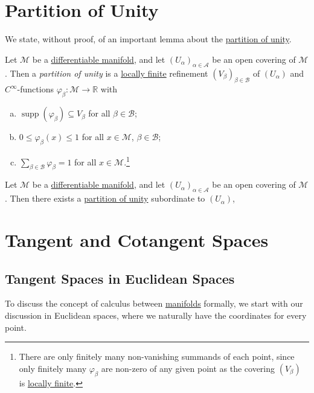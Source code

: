 \section{Partition of Unity}
We state, without proof, of an important lemma about the \hyperref[def:partition-of-unity]{partition of unity}.

\begin{definition}\label{def:partition-of-unity}
	Let \(\mathcal{M} \) be a \hyperref[def:smooth-manifold]{differentiable manifold}, and let \((U_\alpha )_{\alpha \in \mathcal{A} }\) be an open covering of \(\mathcal{M} \). Then a \emph{partition of unity} is a \hyperref[def:locally-finite]{locally finite} refinement \((V_\beta )_{\beta \in \mathcal{B} }\) of \((U_\alpha )\) and \(C^{\infty} \)-functions \(\varphi _\beta \colon \mathcal{M} \to \mathbb{R} \) with
	\begin{enumerate}[(a)]
		\item \(\mathop{\mathrm{supp}}(\varphi _\beta ) \subseteq V_\beta \) for all \(\beta \in \mathcal{B} \);
		\item \(0 \leq \varphi _\beta (x) \leq 1\) for all \(x\in \mathcal{M} \), \(\beta \in \mathcal{B} \);
		\item \(\sum_{\beta \in \mathcal{B} } \varphi _\beta = 1 \) for all \(x\in \mathcal{M} \).\footnote{There are only finitely many non-vanishing summands of each point, since only finitely many \(\varphi _\beta \) are non-zero of any given point as the covering \((V_\beta )\) is \hyperref[def:locally-finite]{locally finite}.}
	\end{enumerate}
\end{definition}

\begin{lemma}\label{lma:partition-of-unity}
	Let \(\mathcal{M} \) be a \hyperref[def:smooth-manifold]{differentiable manifold}, and let \((U_\alpha )_{\alpha \in \mathcal{A} }\) be an open covering of \(\mathcal{M} \). Then there exists a \hyperref[def:partition-of-unity]{partition of unity} subordinate to \((U_\alpha )\),
\end{lemma}

\section{Tangent and Cotangent Spaces}
\subsection{Tangent Spaces in Euclidean Spaces}
To discuss the concept of calculus between \hyperref[def:smooth-manifold]{manifolds} formally, we start with our discussion in Euclidean spaces, where we naturally have the coordinates for every point.

